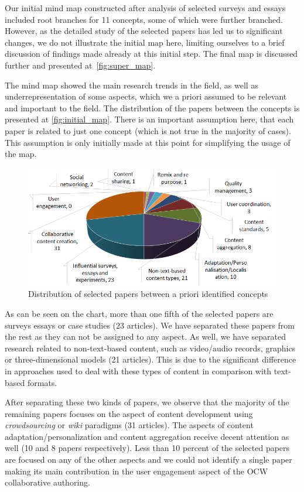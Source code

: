 \documentclass[ngerman,UKenglish,table]{scrbook}
\begin{document}
Our initial mind map constructed after analysis of selected surveys and essays included root branches for 11 concepts, some of which were further branched.
However, as the detailed study of the selected papers has led us to significant changes, we do not illustrate the initial map here, limiting ourselves to a brief discussion of findings made already at this initial step.
The final map is discussed further and presented at~\autoref{fig:super_map}.

The mind map showed the main research trends in the field, as well as underrepresentation of some aspects, which we a priori assumed to be relevant and important to the field.
The distribution of the papers between the concepts is presented at \autoref{fig:initial_map}. 
There is an important assumption here, that each paper is related to just one concept (which is not true in the majority of cases).
This assumption is only initially made at this point for simplifying the usage of the map.


\begin{figure}[!ht]
  \centering
  \includegraphics[width=\textwidth]{images/initial_map.png}
  \caption{Distribution of selected papers between a priori identified concepts}
  \label{fig:initial_map}
\end{figure}

As can be seen on the chart, more than one fifth of the selected papers are surveys essays or case studies (23 articles).
We have separated these papers from the rest as they can not be assigned to any aspect.
As well, we have separated research related to non-text-based content, such as video/audio records, graphics or three-dimensional models (21 articles).
This is due to the significant difference in approaches used to deal with these types of content in comparison with text-based formats.

After separating these two kinds of papers, we observe that the majority of the remaining papers focuses on the aspect of content development using \emph{crowdsourcing} or \emph{wiki} paradigms (31 articles).
The aspects of content adaptation/personalization and content aggregation receive decent attention as well (10 and 8 papers respectively).
Less than 10 percent of the selected papers are focused on any of the other aspects and we could not identify a single paper making its main contribution in the user engagement aspect of the OCW collaborative authoring.
\end{document}
